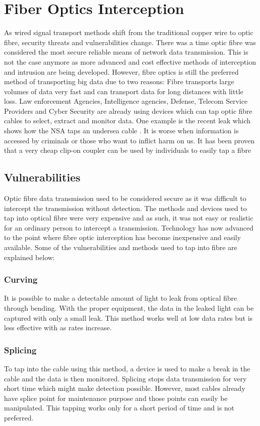 \documentclass{article}
\begin{document}
\section{Fiber Optics Interception}
As wired signal transport methods shift from the traditional copper wire to optic fibre, security threats and vulnerabilities change. There was a time optic fibre was considered the most secure reliable means of network data transmission. This is not the case anymore as more advanced and cost effective methods of interception and intrusion are being developed. However, fibre optics is still the preferred method of transporting big data due to two reasons: Fibre transports large volumes of data very fast and can transport data for long distances with little loss. Law enforcement Agencies, Intelligence agencies, Defense, Telecom Service Providers and Cyber Security are already using devices which can tap optic fibre cables to select, extract and monitor data. One example is the recent leak which shows how the NSA taps an undersea cable \cite{atlantic}. It is worse when information is accessed by criminals or those who want to inflict harm on us. It has been proven that a very cheap clip-on coupler can be used by individuals to easily tap a fibre \cite{opterna}

\subsection{Vulnerabilities}
Optic fibre data transmission used to be considered secure as it was difficult to intercept the transmission without detection. The methods and devices used to tap into optical fibre were very expensive and as such, it was not easy or realistic for an ordinary person to intercept a transmission. Technology has now advanced to the point where fibre optic interception has become inexpensive and easily available. Some of the vulnerabilities and methods used to tap into fibre are explained below:

\subsubsection{Curving}
It is possible to make a detectable amount of light to leak from optical fibre through bending. With the proper equipment, the data in the leaked light can be captured with only a small leak. This method works well at low data rates but is less effective with as rates increase. \cite{sans} 

\subsubsection{Splicing}
To tap into the cable using this method, a device is used to make a break in the cable and the data is then monitored. Splicing stops data transmission for very short time which might make detection possible. However, most cables already have splice point for maintenance purpose and those points can easily be manipulated. This tapping works only for a short period of time and is not preferred. \cite{sans}
\end{document}
